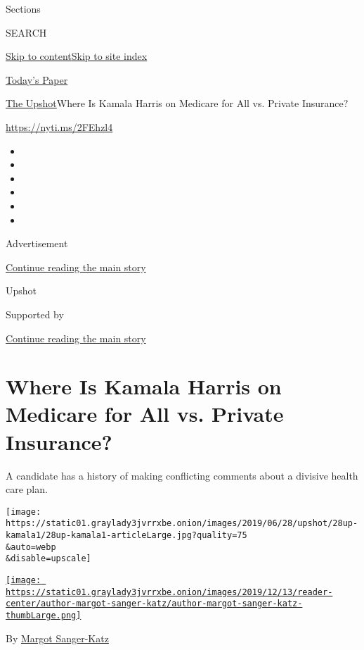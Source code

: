 Sections

SEARCH

\protect\hyperlink{site-content}{Skip to
content}\protect\hyperlink{site-index}{Skip to site index}

\href{https://myaccount.nytimes3xbfgragh.onion/auth/login?response_type=cookie\&client_id=vi}{}

\href{https://www.nytimes3xbfgragh.onion/section/todayspaper}{Today's
Paper}

\href{/section/upshot}{The Upshot}\textbar{}Where Is Kamala Harris on
Medicare for All vs. Private Insurance?

\url{https://nyti.ms/2FEhzl4}

\begin{itemize}
\item
\item
\item
\item
\item
\item
\end{itemize}

Advertisement

\protect\hyperlink{after-top}{Continue reading the main story}

Upshot

Supported by

\protect\hyperlink{after-sponsor}{Continue reading the main story}

\hypertarget{where-is-kamala-harris-on-medicare-for-all-vs-private-insurance}{%
\section{Where Is Kamala Harris on Medicare for All vs. Private
Insurance?}\label{where-is-kamala-harris-on-medicare-for-all-vs-private-insurance}}

A candidate has a history of making conflicting comments about a
divisive health care plan.

\texttt{[image: https://static01.graylady3jvrrxbe.onion/images/2019/06/28/upshot/28up-kamala1/28up-kamala1-articleLarge.jpg?quality=75\\\&auto=webp\\\&disable=upscale]}

\href{https://www.nytimes3xbfgragh.onion/by/margot-sanger-katz}{\texttt{[image: https://static01.graylady3jvrrxbe.onion/images/2019/12/13/reader-center/author-margot-sanger-katz/author-margot-sanger-katz-thumbLarge.png]}}

By
\href{https://www.nytimes3xbfgragh.onion/by/margot-sanger-katz}{Margot
Sanger-Katz}

